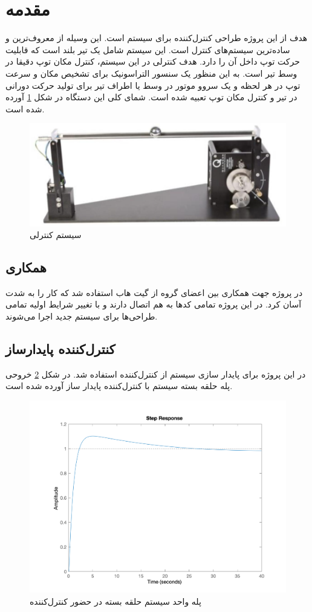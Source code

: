 \chapter*{مقدمه}
هدف از این پروژه طراحی کنترل‌کننده برای سیستم
است.
 این وسیله از معروف‌ترین و ساده‌ترین سیستم‌های کنترل است. این سیستم شامل یک تیر بلند است که قابلیت حرکت توپ داخل آن را دارد. هدف کنترلی در این سیستم، کنترل مکان توپ دقیقا در وسط تیر است. به این منظور  یک سنسور التراسونیک برای تشخیص مکان و سرعت توپ در هر لحظه و یک سروو موتور در وسط یا اطراف تیر برای تولید حرکت دورانی در تیر و کنترل مکان توپ تعبیه شده است. شمای کلی این دستگاه در شکل
\ref{ballbeam}
آورده شده است.
 \begin{figure}[H]
	\includegraphics[width=12cm]{../Figure/Introduction/BallBeam.png}
	\centering
	\caption{سیستم کنترلی}
	\label{ballbeam}
\end{figure}
\section*{همکاری}
در پروژه جهت همکاری بین اعضای گروه از گیت هاب استفاده شد که کار را به شدت آسان کرد. در این پروژه تمامی کدها به هم اتصال دارند و با تغییر شرایط اولیه تمامی طراحی‌ها برای سیستم جدید اجرا می‌شوند.
\section*{کنترل‌کننده پایدارساز}
در این پروژه برای پایدار سازی سیستم از کنترل‌کننده  استفاده شد. در شکل
\ref{stabilizer}
خروحی پله حلقه بسته سیستم با کنترل‌کننده پایدار ساز آورده شده است.
 \begin{figure}[H]
	\includegraphics[width=12cm]{../Figure/Introduction/stabilizer.png}
	\centering
	\caption{پله واحد سیستم حلقه بسته در حضور کنترل‌کننده}
	\label{stabilizer}
\end{figure}